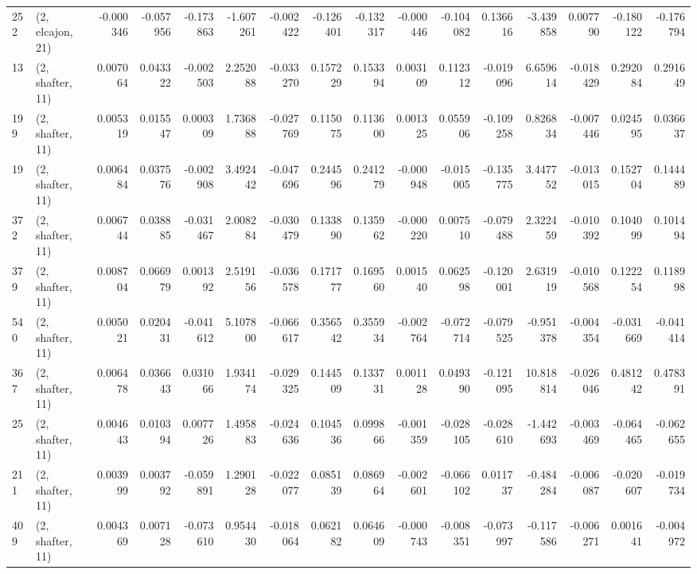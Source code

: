 \begin{tabular}{llrrrrrrrrrrrrrr}
252 &  (2, elcajon, 21) &  -0.000346 & -0.057956 & -0.173863 &   -1.607261 & -0.002422 &  -0.126401 & -0.132317 & -0.000446 & -0.104082 &  0.136616 &   -3.439858 &  0.007790 & -0.180122 & -0.176794 \\
13  &  (2, shafter, 11) &   0.007064 &  0.043322 & -0.002503 &    2.252088 & -0.033270 &   0.157229 &  0.153394 &  0.003109 &  0.112312 & -0.019096 &    6.659614 & -0.018429 &  0.292084 &  0.291649 \\
199 &  (2, shafter, 11) &   0.005319 &  0.015547 &  0.000309 &    1.736888 & -0.027769 &   0.115075 &  0.113600 &  0.001325 &  0.055906 & -0.109258 &    0.826834 & -0.007446 &  0.024595 &  0.036637 \\
19  &  (2, shafter, 11) &   0.006484 &  0.037576 & -0.002908 &    3.492442 & -0.047696 &   0.244596 &  0.241279 & -0.000948 & -0.015005 & -0.135775 &    3.447752 & -0.013015 &  0.152704 &  0.144489 \\
372 &  (2, shafter, 11) &   0.006744 &  0.038885 & -0.031467 &    2.008284 & -0.030479 &   0.133890 &  0.135962 & -0.000220 &  0.007510 & -0.079488 &    2.322459 & -0.010392 &  0.104099 &  0.101494 \\
379 &  (2, shafter, 11) &   0.008704 &  0.066979 &  0.001392 &    2.519156 & -0.036578 &   0.171777 &  0.169560 &  0.001540 &  0.062598 & -0.120001 &    2.631919 & -0.010568 &  0.122254 &  0.118998 \\
540 &  (2, shafter, 11) &   0.005021 &  0.020431 & -0.041612 &    5.107800 & -0.066617 &   0.356542 &  0.355934 & -0.002764 & -0.072714 & -0.079525 &   -0.951378 & -0.004354 & -0.031669 & -0.041414 \\
367 &  (2, shafter, 11) &   0.006478 &  0.036643 &  0.031066 &    1.934174 & -0.029325 &   0.144509 &  0.133731 &  0.001128 &  0.049390 & -0.121095 &   10.818814 & -0.026046 &  0.481242 &  0.478391 \\
25  &  (2, shafter, 11) &   0.004643 &  0.010394 &  0.007726 &    1.495883 & -0.024636 &   0.104536 &  0.099866 & -0.001359 & -0.028105 & -0.028610 &   -1.442693 & -0.003469 & -0.064465 & -0.062655 \\
211 &  (2, shafter, 11) &   0.003999 &  0.003792 & -0.059891 &    1.290128 & -0.022077 &   0.085139 &  0.086964 & -0.002601 & -0.066102 &  0.011737 &   -0.484284 & -0.006087 & -0.020607 & -0.019734 \\
409 &  (2, shafter, 11) &   0.004369 &  0.007128 & -0.073610 &    0.954430 & -0.018064 &   0.062182 &  0.064609 & -0.000743 & -0.008351 & -0.073997 &   -0.117586 & -0.006271 &  0.001641 & -0.004972 \\

\end{tabular}
